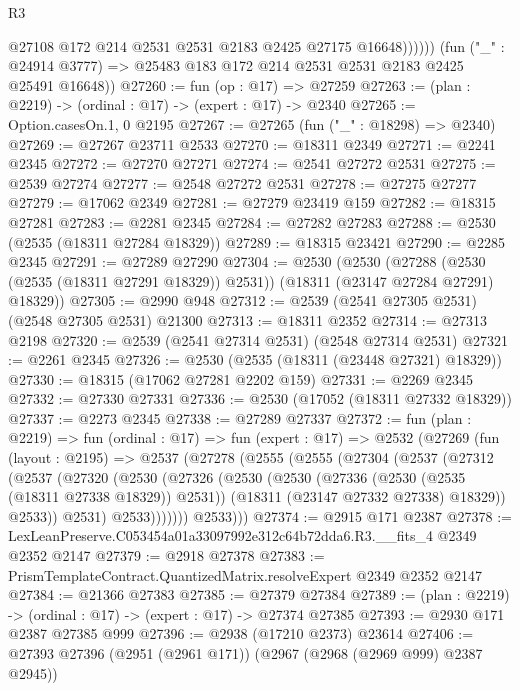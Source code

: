 \begin{lexlean}{R3}
\begin{coremodule}
                @27108 @172 @214 @2531 @2531 @2183 @2425 @27175 @16648))))))
      (fun ("_" : @24914 @3777) => @25483 @183 @172 @214 @2531 @2531 @2183 @2425 @25491 @16648))
@27260 := fun (op : @17) => @27259
@27263 := (plan : @2219) -> (ordinal : @17) -> (expert : @17) -> @2340
@27265 := Option.casesOn.{1, 0} @2195
@27267 := @27265 (fun ("_" : @18298) => @2340)
@27269 := @27267 @23711 @2533
@27270 := @18311 @2349
@27271 := @2241 @2345
@27272 := @27270 @27271
@27274 := @2541 @27272 @2531
@27275 := @2539 @27274
@27277 := @2548 @27272 @2531
@27278 := @27275 @27277
@27279 := @17062 @2349
@27281 := @27279 @23419 @159
@27282 := @18315 @27281
@27283 := @2281 @2345
@27284 := @27282 @27283
@27288 := @2530 (@2535 (@18311 @27284 @18329))
@27289 := @18315 @23421
@27290 := @2285 @2345
@27291 := @27289 @27290
@27304 := @2530
    (@2530
      (@27288 (@2530 (@2535 (@18311 @27291 @18329)) @2531))
      (@18311 (@23147 @27284 @27291) @18329))
@27305 := @2990 @948
@27312 := @2539 (@2541 @27305 @2531) (@2548 @27305 @2531) @21300
@27313 := @18311 @2352
@27314 := @27313 @2198
@27320 := @2539 (@2541 @27314 @2531) (@2548 @27314 @2531)
@27321 := @2261 @2345
@27326 := @2530 (@2535 (@18311 (@23448 @27321) @18329))
@27330 := @18315 (@17062 @27281 @2202 @159)
@27331 := @2269 @2345
@27332 := @27330 @27331
@27336 := @2530 (@17052 (@18311 @27332 @18329))
@27337 := @2273 @2345
@27338 := @27289 @27337
@27372 := fun (plan : @2219) =>
  fun (ordinal : @17) =>
  fun (expert : @17) =>
  @2532
    (@27269
      (fun (layout : @2195) =>
      @2537
        (@27278
          (@2555
            (@2555
              (@27304
                (@2537
                  (@27312
                    (@2537
                      (@27320
                        (@2530
                          (@27326
                            (@2530
                              (@2530
                                (@27336 (@2530 (@2535 (@18311 @27338 @18329)) @2531))
                                (@18311 (@23147 @27332 @27338) @18329))
                              @2533))
                          @2531)
                        @2533)))))))
          @2533)))
@27374 := @2915 @171 @2387
@27378 := LexLeanPreserve.C053454a01a33097992e312c64b72dda6.R3.__fits_4 @2349 @2352 @2147
@27379 := @2918 @27378
@27383 := PrismTemplateContract.QuantizedMatrix.resolveExpert @2349 @2352 @2147
@27384 := @21366 @27383
@27385 := @27379 @27384
@27389 := (plan : @2219) -> (ordinal : @17) -> (expert : @17) -> @27374 @27385
@27393 := @2930 @171 @2387 @27385 @999
@27396 := @2938 (@17210 @2373) @23614
@27406 := @27393 @27396 (@2951 (@2961 @171)) (@2967 (@2968 (@2969 @999) @2387 @2945))

\end{coremodule}
\end{lexlean}
